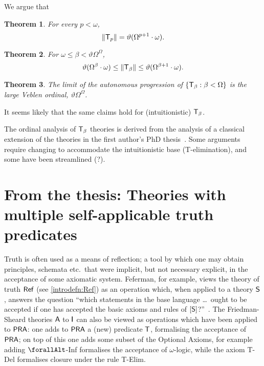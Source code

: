 \documentclass[UKenglish,cleveref,DIV=12]{scrartcl}
\let\forall\forallAlt
\newtheorem{theorem}{Theorem}
\theoremstyle{definition}
\theoremstyle{definition}
\begin{document}
We argue that
%
\begin{theorem}
	For every \( p < \omega \),
\[
  \lVert{\mathsf{T}_p}\rVert = \vartheta ( \Omega ^{p+1} \cdot \omega ).
\]
\end{theorem}

\begin{theorem}
	For \( \omega \le \beta < \vartheta \Omega^\Omega \),
\[
	\vartheta(\Omega^\beta \cdot \omega) \le \lVert{\mathsf{T}_\beta}\rVert \le \vartheta ( \Omega ^{\beta+1} \cdot \omega ).
\]
\end{theorem}

\begin{theorem}
	The limit of the autonomous progression of \( \{ \mathsf{T}_\beta : \beta < \Omega \} \) is the large Veblen ordinal, \( \vartheta \Omega^\Omega \).
\end{theorem}

It seems likely that the same claims hold for (intuitionistic) \( \mathsf{T}_\beta \).

The ordinal analysis of \( \mathsf{T}_\beta \) theories is derived from the analysis of a classical extension of the theories in the first author's PhD thesis~\cite{GEL-thesis}.
Some arguments require changing to accommodate the intuitionistic base (T-elimination), and some have been streamlined (?).

\section{From the thesis: Theories with multiple self-applicable truth predicates}
\label{chap:ext}

\fussy Truth is often used as a means of reflection; a tool by which one may obtain
principles, schemata etc.~that were implicit, but not necessary explicit, in the
acceptance of some axiomatic system. Feferman, for example, views the theory
of truth $\mathsf{Ref}$ (see \cref{introdefn:Ref}) as an operation which, when applied
to a theory $\mathsf{S}$, answers the question ``which statements in the base
language \dots{}\ {ought} to be accepted {if} one has accepted the basic axioms and
rules of $[\mathsf{S}]$?''~\cite[p.~2]{Fef91}.
The Friedman-Sheard theories $\mathsf{A}$ to $\mathsf{I}$ can also be viewed as operations which
have been applied to $\mathsf{PRA}$: one adds to $\mathsf{PRA}$ a (new) predicate $\mathsf{T}$,
formalising the acceptance of $\mathsf{PRA}$; on top of this one adds some subset of the Optional
Axioms, for example adding $\forall$-Inf formalises the acceptance of
$\omega$-logic, while the axiom T-Del formalises closure under the rule T-Elim.
\end{document}
